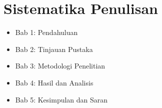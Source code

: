 \section{Sistematika Penulisan}
\label{sec:sistematikaPenulisan}

\begin{itemize}
	\item Bab 1: Pendahuluan
	\item Bab 2: Tinjauan Pustaka
	\item Bab 3: Metodologi Penelitian
	\item Bab 4: Hasil dan Analisis
	\item Bab 5: Kesimpulan dan Saran
\end{itemize}

